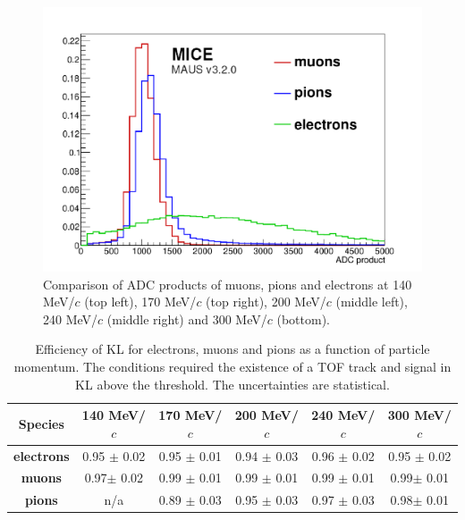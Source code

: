 \begin{figure}[htb!]
\begin{center}
 		\includegraphics[width=0.45\columnwidth]{./04-KL/Figures/mu_vs_pi_vs_e_300MEV.pdf}
 		\caption{Comparison of ADC products of muons, pions and electrons at 140 MeV/$c$ (top left), 170 MeV/$c$ (top right), 200 MeV/$c$ (middle left), 240 MeV/$c$ (middle right) and 300 MeV/$c$ (bottom).}
 		\label{fig:KL4}
 	\end{center}
\end{figure}

       
  \begin{table}[!htb]
  	\begin{center}
  		\begin{tabular}{c|c|c|c|c|c} 
  			\textbf{Species} &\textbf{140 MeV/$c$} & \textbf{170 MeV/$c$} & \textbf{200 MeV/$c$}	&\textbf{240 MeV/$c$} &\textbf{300 MeV/$c$}\\
  			\hline
  			\textbf{electrons} & 0.95 $\pm$ 0.02  & 0.95 $\pm$ 0.01 & 0.94 $\pm$ 0.03 &  0.96 $\pm$ 0.02 &  0.95 $\pm$ 0.02 \\
  			\hline
  			\textbf{muons} &  0.97$\pm$ 0.02 & 0.99 $\pm$ 0.01  & 0.99 $\pm$  0.01 & 0.99 $\pm$ 0.01 & 0.99$\pm$ 0.01\\
  			\hline
  			\textbf{pions} &  n/a  & 0.89 $\pm$ 0.03  & 0.95 $\pm$ 0.03 & 0.97 $\pm$ 0.03 & 0.98$\pm$ 0.01\\
  		\end{tabular}
  		\caption{Efficiency of KL for electrons, muons and pions as a function of particle momentum. The conditions required the existence of a TOF track and signal in KL above the threshold. The uncertainties are statistical.}
  		\label{tab:KL_eff}
  	\end{center}
  \end{table}

